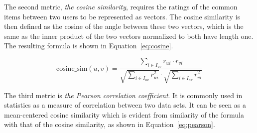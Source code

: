 %
%
%

The second metric, \textit{the cosine similarity}, requires the ratings of the common items between two users to be represented as vectors.
The cosine similarity is then defined as the cosine of the angle between these two vectors, which is the same as the inner product of the two vectors normalized to both have length one.
The resulting formula is shown in Equation~\ref{eq:cosine}.

\begin{equation}
    \label{eq:cosine}
    \text{cosine\_sim}(u,v) = \frac{\sum\limits_{i \in I_{uv}} r_{ui} \cdot r_{vi}}{\sqrt{\sum\limits_{i \in I_{uv}} r_{ui}^2}\cdot\sqrt{\sum\limits_{i \in I_{uv}} r_{vi}^2}}
\end{equation}

The third metric is \textit{the Pearson correlation coefficient}.
It is commonly used in statistics as a measure of correlation between two data sets.
It can be seen as a mean-centered cosine similarity which is evident from similarity of the formula with that of the cosine similarity, as shown in Equation~\ref{eq:pearson}.

